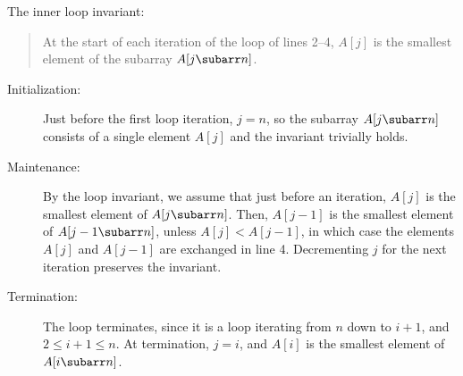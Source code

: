 The inner loop invariant:
\begin{quote}
    At the start of each iteration of the  loop of lines 2--4, $A[j]$ is the smallest element of the subarray $A[j\subarr n]$.
\end{quote}

\begin{description}
    \item[Initialization:] Just before the first loop iteration, $j=n$, so the subarray $A[j\subarr n]$ consists of a single element $A[j]$ and the invariant trivially holds.
    \item[Maintenance:] By the loop invariant, we assume that just before an iteration, $A[j]$ is the smallest element of $A[j\subarr n]$.
    Then, $A[j-1]$ is the smallest element of $A[j-1\subarr n]$, unless $A[j]<A[j-1]$, in which case the elements $A[j]$ and $A[j-1]$ are exchanged in line 4.
    Decrementing $j$ for the next iteration preserves the invariant.
    \item[Termination:] The loop terminates, since it is a  loop iterating from $n$ down to $i+1$, and $2\le i+1\le n$.
    At termination, $j=i$, and $A[i]$ is the smallest element of $A[i\subarr n]$.
\end{description}
